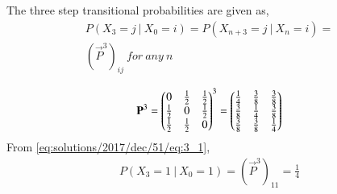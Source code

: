 %
%
The three step transitional probabilities are given as,
\begin{align}
    P(X_3 = j \: | \: X_0 = i) = P(X_{n+3} = j \: | \: X_n = i) = \nonumber \\
    (\vec{P}^3)_{ij} \: for \: any \: n
\end{align}

\begin{align} \label{eq:solutions/2017/dec/51/eq:3_1}
    \mathbf{P}^3 = \begin{pmatrix}0 & \frac{1}{2} & \frac{1}{2} \\
    \frac{1}{2} & 0 & \frac{1}{2} \\
    \frac{1}{2} & \frac{1}{2} & 0\end{pmatrix}^3 = 
    \begin{pmatrix}\frac{1}{4} & \frac{3}{8} & \frac{3}{8} \\
    \frac{3}{8} & \frac{1}{4} & \frac{3}{8} \\
    \frac{3}{8} & \frac{3}{8} & \frac{1}{4}\end{pmatrix}
\end{align}
From \eqref{eq:solutions/2017/dec/51/eq:3_1},
\begin{align}
    P(X_3 = 1 \: | \: X_0 = 1) = (\vec{P}^3)_{11} = \frac{1}{4}
\end{align}
